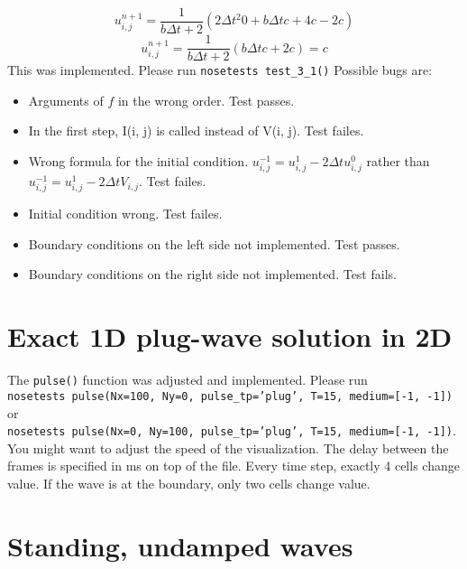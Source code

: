 \documentclass{report}
\begin{document}
        $$
        u^{n+1}_{i,j} = \frac{1}{b \Delta t + 2} (2\Delta t^2 0 + b \Delta t c+4 c-2c )
        $$
        $$
        u^{n+1}_{i,j} = \frac{1}{b \Delta t + 2} (b \Delta t c+2 c)=c
        $$
        This was implemented. Please run \texttt{nosetests test\_3\_1()}
        Possible bugs are:
        \begin{itemize}
        \item Arguments of $f$ in the wrong order. Test passes.
        \item In the first step, I(i, j) is called instead of V(i, j). Test failes.
        \item Wrong formula for the initial condition. $u^{-1}_{i,j} = u^{1}_{i,j}-2 \Delta t u^{0}_{i,j}$ rather than $u^{-1}_{i,j} = u^{1}_{i,j}-2 \Delta t V_{i,j}$. Test failes.
        \item  Initial condition wrong. Test failes.
        \item  Boundary conditions on the left side not implemented. Test passes.
        \item  Boundary conditions on the right side not implemented. Test fails.
        \end{itemize}
        
        
        \section*{Exact 1D plug-wave solution in 2D}
        
        The \texttt{pulse()} function was adjusted and implemented. Please run\\
        \texttt{nosetests pulse(Nx=100, Ny=0, pulse\_tp='plug', T=15, medium=[-1, -1])} or\\ \texttt{nosetests pulse(Nx=0, Ny=100, pulse\_tp='plug', T=15, medium=[-1, -1])}.\\
        You might want to adjust the speed of the visualization. The delay between the frames is specified in ms on top of the file.
        Every time step, exactly 4 cells change value. If the wave is at the boundary, only two cells change value.
        
        
        \section*{Standing, undamped waves}
        
\end{document}
